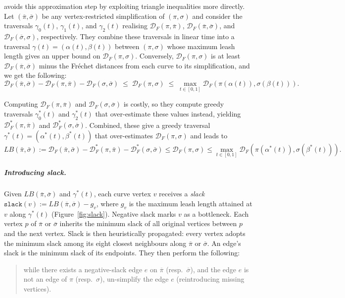 \documentclass[10pt,a4paper]{article}
\newcommand{\fd}{\mathcal{D}_F}
\begin{document}
\cite{harpeled_et_al:LIPIcs.SoCG.2025.54} avoids this approximation step by exploiting triangle inequalities more directly. 
Let $(\overline{\pi},\overline{\sigma})$ be any vertex-restricted simplification of $(\pi,\sigma)$ and consider the traversals $\gamma_0(t)$, $\gamma_1(t)$, and $\gamma_2(t)$ realising $\fd(\pi,\overline{\pi})$, $\fd(\overline{\pi},\overline{\sigma})$, and $\fd(\overline{\sigma},\sigma)$, respectively. 
They combine these traversals in linear time into a traversal $\gamma(t)=(\alpha(t),\beta(t))$ between $(\pi,\sigma)$ whose maximum leash length gives an upper bound on $\fd(\pi,\sigma)$. 
Conversely, $\fd(\pi,\sigma)$ is at least $\fd(\overline{\pi},\overline{\sigma})$ minus the Fréchet distances from each curve to its simplification, and we get the following:
\[
\fd(\overline{\pi},\overline{\sigma}) - \fd(\pi,\overline{\pi}) - \fd(\sigma,\overline{\sigma})
\;\leq\; \fd(\pi,\sigma)
\;\leq\;
\max_{t\in[0,1]} \fd(\pi(\alpha(t)),\sigma(\beta(t))).
\]

Computing $\fd(\pi,\overline{\pi})$ and $\fd(\sigma,\overline{\sigma})$ is costly, so they compute greedy traversals $\gamma_0^*(t)$ and $\gamma_2^*(t)$ that over-estimate these values instead, yielding $\fd^*(\pi,\overline{\pi})$ and $\fd^*(\sigma,\overline{\sigma})$. 
Combined, these give a greedy traversal $\gamma^*(t)=(\alpha^*(t),\beta^*(t))$ that over-estimates $\fd(\pi,\sigma)$ and leads to
\begin{equation}
\label{eq:inequality}
LB(\bar\pi,\bar\sigma)
:=\fd(\bar\pi,\bar\sigma)-\fd^*(\pi,\bar\pi)-\fd^*(\sigma,\bar\sigma)
\le \fd(\pi,\sigma)
\le \max_{t\in[0,1]}\fd(\pi(\alpha^*(t)),\sigma(\beta^*(t))).
\end{equation}

\subparagraph{Introducing slack.}
Given $LB(\overline{\pi},\overline{\sigma})$ and $\gamma^*(t)$, each curve vertex $v$ receives a \emph{slack} $
\texttt{slack}(v) := LB(\overline{\pi},\overline{\sigma}) - g_v$,
where $g_v$ is the maximum leash length attained at $v$ along $\gamma^*(t)$ (Figure~\ref{fig:slack}).  
Negative slack marks $v$ as a bottleneck.  
Each vertex $p$ of $\overline{\pi}$ or $\overline{\sigma}$ inherits the minimum slack of all original vertices between $p$ and the next vertex.  
Slack is then heuristically propagated: every vertex adopts the minimum slack among its eight closest neighbours along $\overline{\pi}$ or $\overline{\sigma}$. 
An edge’s slack is the minimum slack of its endpoints.  
They then perform the following:

\begin{quote}
    while there exists a negative-slack edge $e$ on $\overline{\pi}$ (resp.\ $\overline{\sigma}$), and the edge $e$ is not an edge of $\pi$ (resp.\ $\sigma$), un-simplify the edge $e$ (reintroducing missing vertices).
\end{quote}
\end{document}
